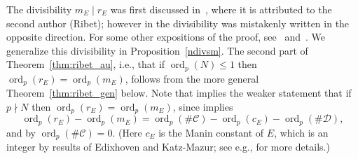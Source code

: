 \documentclass[10pt,twoside]{article}
\newcommand{\edit}[1]{\footnote{EDIT: #1}\marginpar{\hfill {\sf \thefootnote}}}
\newcommand{\re}{r_{\scriptscriptstyle E}}
\newcommand{\me}{m_{\scriptscriptstyle E}}
\newcommand{\ce}{c_{\scriptscriptstyle{E}}}
\theoremstyle{definition}
\DeclareMathOperator{\ord}{ord}
\begin{document}
The divisibility $\me\mid \re$ was first discussed
in~\cite[Th.~3]{zagier}, where it is attributed to the second author
(Ribet); however in \cite{zagier} the divisibility was mistakenly
written in the opposite direction. For some other expositions of the
proof, see~\cite[Lem~3.2]{abbull} and~\cite{cojo-kani}.  We generalize
this divisibility in Proposition~\ref{ndivsm}.  The second part of
Theorem~\ref{thm:ribet_au}, i.e., that if $\ord_p(N) \leq 1$ then
$\ord_p(\re) = \ord_p(\me)$, follows from the more general
Theorem~\ref{thm:ribet_gen} below.
Note that \cite[Prop.~3.3--3.4]{abbull} implies the weaker
statement that if $p\nmid N$ then $\ord_p(\re)=\ord_p(\me)$,
since \cite[Prop.~3.3]{abbull} 
implies $$\ord_p(\re) - \ord_p(\me) = \ord_p(\#\mathcal{C})
- \ord_p(\ce) - \ord_p(\#\mathcal{D}),$$ and by \cite[Prop.~3.4]{abbull}
$\ord_p(\#\mathcal{C}) =0$.  (Here $\ce$ is the Manin
constant of $E$, which is an integer by results of
Edixhoven and Katz-Mazur; see e.g., \cite{ars} for more details.)
\end{document}
